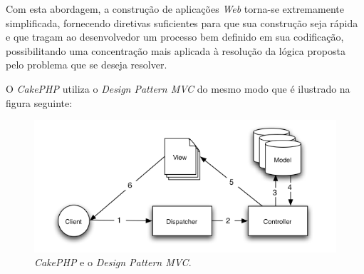 Com esta abordagem, a construção de aplicações \textit{Web} torna-se extremamente simplificada, fornecendo diretivas suficientes para que sua construção seja rápida e que tragam ao desenvolvedor um processo bem definido em sua codificação, possibilitando uma concentração mais aplicada à resolução da lógica proposta pelo problema que se deseja resolver.

O \textit{CakePHP} utiliza o \textit{Design Pattern MVC} do mesmo modo que é ilustrado na figura seguinte:

\begin{figure}[h!tp]
    \begin{center}
        \includegraphics[scale=0.8]{./figuras/basic_mvc_cake.png}

        \caption{\textit{CakePHP} e o \textit{Design Pattern MVC}.}
    \end{center}
\end{figure}

